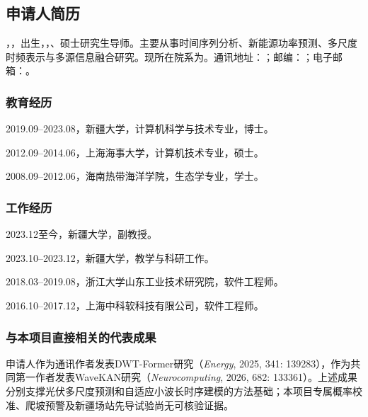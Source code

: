 \subsection{申请人简历}
，，出生，，、硕士研究生导师。主要从事时间序列分析、新能源功率预测、多尺度时频表示与多源信息融合研究。现所在院系为。通讯地址：；邮编：；电子邮箱：。

\subsubsection{教育经历}
2019.09--2023.08，新疆大学，计算机科学与技术专业，博士。

2012.09--2014.06，上海海事大学，计算机技术专业，硕士。

2008.09--2012.06，海南热带海洋学院，生态学专业，学士。

\subsubsection{工作经历}
2023.12至今，新疆大学，副教授。

2023.10--2023.12，新疆大学，教学与科研工作。

2018.03--2019.08，浙江大学山东工业技术研究院，软件工程师。

2016.10--2017.12，上海中科软科技有限公司，软件工程师。

\subsubsection{与本项目直接相关的代表成果}
申请人作为通讯作者发表DWT-Former研究（\textit{Energy}, 2025, 341: 139283）\cite{sun2025dwt}，作为共同第一作者发表WaveKAN研究（\textit{Neurocomputing}, 2026, 682: 133361）\cite{liu2026wavekan}。上述成果分别支撑光伏多尺度预测和自适应小波长时序建模的方法基础；本项目专属概率校准、爬坡预警及新疆场站先导试验尚无可核验证据。
